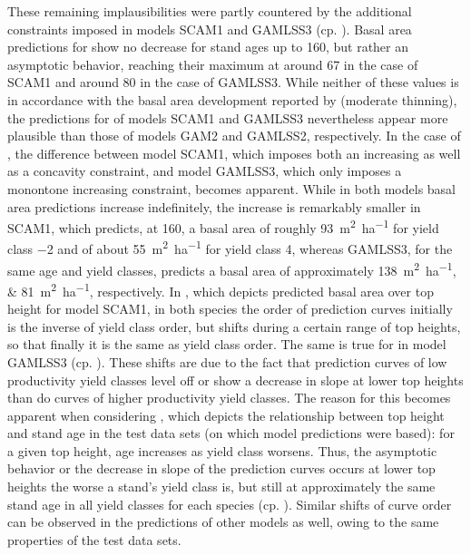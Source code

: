 These remaining implausibilities were partly countered by the additional constraints imposed in models SCAM1 and GAMLSS3 (cp. ).  Basal area predictions for \Beech{} show no decrease for stand ages up to \SI{160}{\year}, but rather an asymptotic behavior, reaching their maximum at around \SI{67}{\year} in the case of SCAM1 and around \SI{80}{\year} in the case of GAMLSS3.  While neither of these values is in accordance with the basal area development reported by \textcite{Schober1995} (moderate thinning), the predictions for \Beech{} of models SCAM1 and GAMLSS3 nevertheless appear more plausible than those of models GAM2 and GAMLSS2, respectively.  In the case of \Spruce{}, the difference between model SCAM1, which imposes both an increasing as well as a concavity constraint, and model GAMLSS3, which only imposes a monontone increasing constraint, becomes apparent.  While in both models basal area predictions increase indefinitely, the increase is remarkably smaller in SCAM1, which predicts, at \SI{160}{\year}, a basal area of roughly \SI{93}{\square\meter\per\hectare} for yield class \num{-2} and of about \SI{55}{\square\meter\per\hectare} for yield class \num{4}, whereas GAMLSS3, for the same age and yield classes, predicts a basal area of approximately \SIlist{138;81}{\square\meter\per\hectare}, respectively.
In , which depicts predicted basal area over top height for model SCAM1, in both species the order of prediction curves initially is the inverse of yield class order, but shifts during a certain range of top heights, so that finally it is the same as yield class order.
The same is true for \Beech{} in model GAMLSS3 (cp. ).  These shifts are due to the fact that prediction curves of low productivity yield classes level off or show a decrease in slope at lower top heights than do curves of higher productivity yield classes.
The reason for this becomes apparent when considering , which depicts the relationship between top height and stand age in the test data sets (on which model predictions were based):  for a given top height, age increases as yield class worsens.  Thus, the asymptotic behavior or the decrease in slope of the prediction curves occurs at lower top heights the worse a stand’s yield class is, but still at approximately the same stand age in all yield classes for each species (cp. ).  Similar shifts of curve order can be observed in the predictions of other models as well, owing to the same properties of the test data sets.
